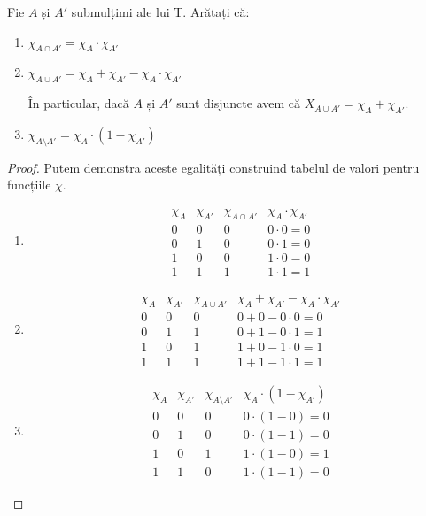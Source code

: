 \begin{exercise}
Fie \(A\) și \(A'\) submulțimi ale lui T. Arătați că:
\begin{enumerate}
    \item \(\chi_{A \cap {A'}} = \chi_A \cdot \chi_{A'}\)
    \item \(\chi_{A \cup {A'}} = \chi_A + \chi_{A'} - \chi_A \cdot \chi_{A'}\)
    
    În particular, dacă \(A\) și \(A'\) sunt disjuncte avem că \(X_{A \cup {A'}} = \chi_A + \chi_{A'}\).
    \item \(\chi_{A \setminus A'} = \chi_A \cdot (1 - \chi_{A'})\)
\end{enumerate}
\end{exercise}
\begin{proof}
Putem demonstra aceste egalități construind tabelul de valori pentru funcțiile \(\chi\).
\begin{enumerate}
    \item
    \[
    \begin{array}{cccc}
        \chi_A & \chi_{A'} & \chi_{A \cap A'} & \chi_A \cdot \chi_{A'} \\
        0 & 0 & 0 & 0 \cdot 0 = 0 \\
        0 & 1 & 0 & 0 \cdot 1 = 0 \\
        1 & 0 & 0 & 1 \cdot 0 = 0 \\
        1 & 1 & 1 & 1 \cdot 1 = 1
    \end{array}
    \]
    
    \item
    \[
    \begin{array}{cccc}
         \chi_A & \chi_{A'} & \chi_{A \cup A'} & \chi_A + \chi_{A'} - \chi_A \cdot \chi_{A'}  \\
         0 & 0 & 0 & 0 + 0 - 0 \cdot 0 = 0 \\
         0 & 1 & 1 & 0 + 1 - 0 \cdot 1 = 1 \\
         1 & 0 & 1 & 1 + 0 - 1 \cdot 0 = 1 \\
         1 & 1 & 1 & 1 + 1 - 1 \cdot 1 = 1
    \end{array}
    \]
    
    \item
    \[
    \begin{array}{cccc}
         \chi_A & \chi_{A'} & \chi_{A \setminus A'} & \chi_A \cdot (1 - \chi_{A'})  \\
         0 & 0 & 0 & 0 \cdot (1 - 0) = 0 \\
         0 & 1 & 0 & 0 \cdot (1 - 1) = 0 \\
         1 & 0 & 1 & 1 \cdot (1 - 0) = 1 \\
         1 & 1 & 0 & 1 \cdot (1 - 1) = 0
    \end{array}
    \]
\end{enumerate}
\end{proof}

